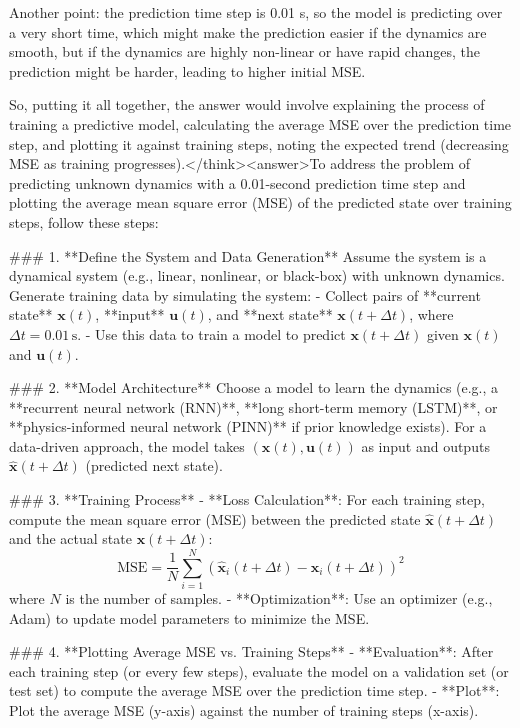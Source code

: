 Another point: the prediction time step is 0.01 s, so the model is predicting over a very short time, which might make the prediction easier if the dynamics are smooth, but if the dynamics are highly non-linear or have rapid changes, the prediction might be harder, leading to higher initial MSE.

So, putting it all together, the answer would involve explaining the process of training a predictive model, calculating the average MSE over the prediction time step, and plotting it against training steps, noting the expected trend (decreasing MSE as training progresses).</think><answer>To address the problem of predicting unknown dynamics with a 0.01-second prediction time step and plotting the average mean square error (MSE) of the predicted state over training steps, follow these steps:  


### 1. **Define the System and Data Generation**  
Assume the system is a dynamical system (e.g., linear, nonlinear, or black-box) with unknown dynamics. Generate training data by simulating the system:  
- Collect pairs of **current state** \( \mathbf{x}(t) \), **input** \( \mathbf{u}(t) \), and **next state** \( \mathbf{x}(t+\Delta t) \), where \( \Delta t = 0.01 \, \text{s} \).  
- Use this data to train a model to predict \( \mathbf{x}(t+\Delta t) \) given \( \mathbf{x}(t) \) and \( \mathbf{u}(t) \).  


### 2. **Model Architecture**  
Choose a model to learn the dynamics (e.g., a **recurrent neural network (RNN)**, **long short-term memory (LSTM)**, or **physics-informed neural network (PINN)** if prior knowledge exists). For a data-driven approach, the model takes \( (\mathbf{x}(t), \mathbf{u}(t)) \) as input and outputs \( \hat{\mathbf{x}}(t+\Delta t) \) (predicted next state).  


### 3. **Training Process**  
- **Loss Calculation**: For each training step, compute the mean square error (MSE) between the predicted state \( \hat{\mathbf{x}}(t+\Delta t) \) and the actual state \( \mathbf{x}(t+\Delta t) \):  
  \[
  \text{MSE} = \frac{1}{N} \sum_{i=1}^N \left( \hat{\mathbf{x}}_i(t+\Delta t) - \mathbf{x}_i(t+\Delta t) \right)^2
  \]  
  where \( N \) is the number of samples.  
- **Optimization**: Use an optimizer (e.g., Adam) to update model parameters to minimize the MSE.  


### 4. **Plotting Average MSE vs. Training Steps**  
- **Evaluation**: After each training step (or every few steps), evaluate the model on a validation set (or test set) to compute the average MSE over the prediction time step.  
- **Plot**: Plot the average MSE (y-axis) against the number of training steps (x-axis).  

